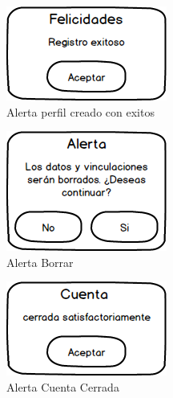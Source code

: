 \newpage
\begin{figure}[h]
\begin{center}
	\includegraphics[scale=0.55]{./resources/03mensaje.png}
	\caption{Alerta perfil creado con exitos}
	\label{fig:exito}
\end{center}
\end{figure}
\begin{figure}[h]
\begin{center}
	\includegraphics[scale=0.55]{./resources/10mensage3.png}
	\caption{Alerta Borrar}
	\label{fig:borrar}
\end{center}
\end{figure}
\begin{figure}[h]
\begin{center}
	\includegraphics[scale=0.55]{./resources/11mensage4.png}
	\caption{Alerta Cuenta Cerrada}
	\label{fig:cerrada}
\end{center}
\end{figure}

